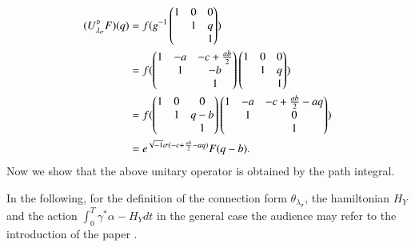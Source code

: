 \begin{align*}
(U_{\lambda_{\sigma}}^{\mathfrak{p}}F)(q)&= f(g^{-1}\begin{pmatrix}
1 & 0 & 0\\
  & 1 & q\\
  &   & 1
\end{pmatrix})\\
& =f(\begin{pmatrix}
1 & -a & -c+\frac{ab}{2}\\
  & 1 & -b\\
  &   & 1
\end{pmatrix}
\begin{pmatrix}
1 & 0 & 0\\
  & 1 & q\\
  &   & 1
\end{pmatrix}
)\\
& =f(
\begin{pmatrix}
1 & 0 & 0\\
  & 1 & q-b\\
  &   & 1
\end{pmatrix}
\begin{pmatrix}
1 & -a & -c+\frac{ab}{2}-aq\\
  & 1 & 0\\
  &   & 1
\end{pmatrix}
) \\
&= e^{\sqrt{-1}\sigma(-c +\frac{ab}{2}-aq)}F(q-b).
\end{align*}
 Now we show that the above unitary operator is obtained by the path integral.

 In the following, for the definition of the connection form $\theta_{\lambda_{\sigma}}$, the hamiltonian $H_{Y}$ and the action $\int_{0}^{T}\gamma^{*}\alpha-H_{Y}dt$ in the general case the audience may refer to the introduction of the paper \cite{art15-key5}.


